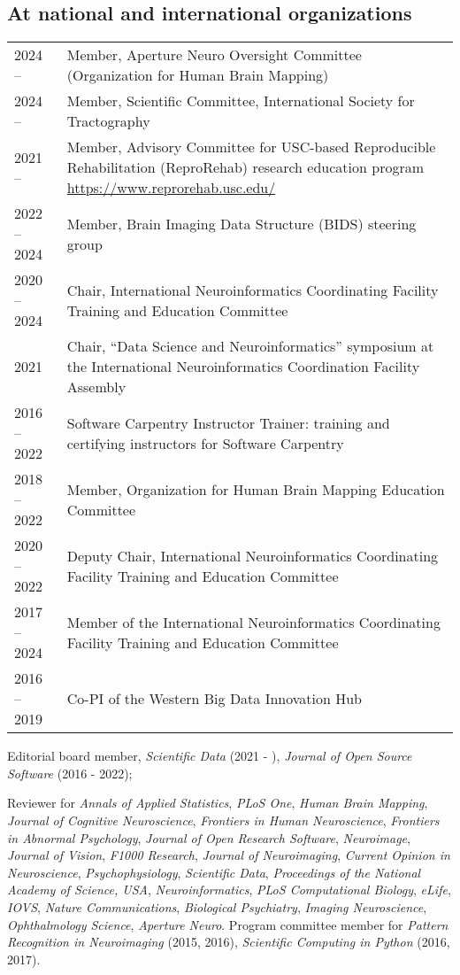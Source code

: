 \documentclass[11pt,fullpage]{article}
\begin{document}
\subsection*{At national and international organizations}
\begin{tabular}{p{}p{}}
2024 -- & Member, Aperture Neuro Oversight Committee (Organization for Human Brain Mapping)\\
2024 -- & Member, Scientific Committee, International Society for Tractography\\
2021 -- & Member, Advisory Committee for USC-based Reproducible Rehabilitation (ReproRehab) research education program \url{https://www.reprorehab.usc.edu/}\\
2022 -- 2024 & Member, Brain Imaging Data Structure (BIDS) steering group\\
2020 -- 2024 & Chair, International Neuroinformatics Coordinating Facility Training and Education Committee\\
2021 & Chair, ``Data Science and Neuroinformatics'' symposium at the International Neuroinformatics Coordination Facility Assembly\\
2016 -- 2022 & Software Carpentry Instructor Trainer: training and certifying instructors for Software Carpentry\\
2018 -- 2022 & Member, Organization for Human Brain Mapping Education Committee\\
2020 -- 2022 & Deputy Chair, International Neuroinformatics Coordinating Facility Training and Education Committee\\
2017 -- 2024 & Member of the International Neuroinformatics Coordinating Facility Training and Education Committee\\
2016 -- 2019 & Co-PI of the Western Big Data Innovation Hub\\
\end{tabular}

\bigskip
Editorial board member, \emph{Scientific Data} (2021 - ), \emph{Journal of Open Source Software} (2016 - 2022);

\vspace{4pt}

Reviewer for \emph{Annals of Applied Statistics}, \emph{PLoS One}, \emph{Human Brain Mapping}, \emph{Journal of Cognitive Neuroscience}, \emph{Frontiers in Human Neuroscience}, \emph{Frontiers in Abnormal Psychology}, \emph{Journal of Open Research Software}, \emph{Neuroimage}, \emph{Journal of Vision}, \emph{F1000 Research}, \emph{Journal of Neuroimaging}, \emph{Current Opinion in Neuroscience}, \emph{Psychophysiology}, \emph{Scientific Data}, \emph{Proceedings of the National Academy of Science, USA}, \emph{Neuroinformatics}, \emph{PLoS Computational Biology}, \emph{eLife}, \emph{IOVS}, \emph{Nature Communications}, \emph{Biological Psychiatry}, \emph{Imaging Neuroscience}, \emph{Ophthalmology Science}, \emph{Aperture Neuro}. Program committee member for \emph{Pattern Recognition in Neuroimaging} (2015, 2016), \emph{Scientific Computing in Python} (2016, 2017).
\end{document}

